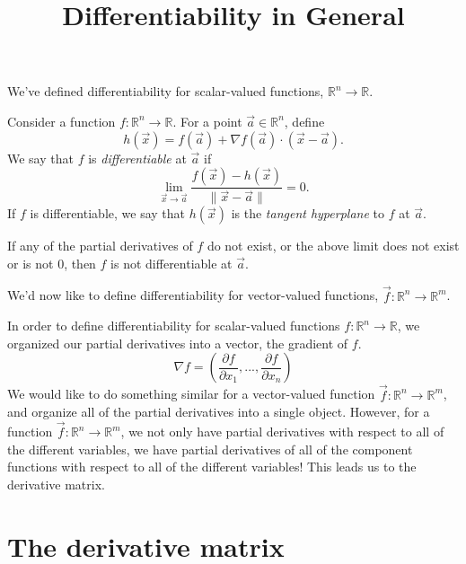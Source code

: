 \documentclass{ximera}
\title{Differentiability in General}
\begin{document}
\begin{abstract}
\end{abstract}
\maketitle

We've defined differentiability for scalar-valued functions, $\mathbb{R}^n\rightarrow\mathbb{R}$.

\begin{definition}
Consider a function $f:\mathbb{R}^n\rightarrow\mathbb{R}$. For a point $\vec{a}\in\mathbb{R}^n$, define
\[
h(\vec{x}) = f(\vec{a})+\nabla f(\vec{a})\cdot (\vec{x}-\vec{a}).
\]
We say that $f$ is \emph{differentiable} at $\vec{a}$ if
\[
\lim_{\vec{x}\rightarrow \vec{a}}\frac{f(\vec{x}) - h(\vec{x})}{\|\vec{x}-\vec{a}\|} = 0.
\]
If $f$ is differentiable, we say that $h(\vec{x})$ is the \emph{tangent hyperplane} to $f$ at $\vec{a}$.

If any of the partial derivatives of $f$ do not exist, or the above limit does not exist or is not $0$, then $f$ is not differentiable at $\vec{a}$.
\end{definition}

We'd now like to define differentiability for vector-valued functions, $\vec{f}:\mathbb{R}^n\rightarrow\mathbb{R}^m$.

In order to define differentiability for scalar-valued functions $f:\mathbb{R}^n\rightarrow\mathbb{R}$, we organized our partial derivatives into a vector, the gradient of $f$.
\[
\nabla f = \left(\frac{\partial f}{\partial x_1},...,\frac{\partial f}{\partial x_n}\right)
\]
We would like to do something similar for a vector-valued function $\vec{f}:\mathbb{R}^n\rightarrow\mathbb{R}^m$, and organize all of the partial derivatives into a single object. However, for a function $\vec{f}:\mathbb{R}^n\rightarrow\mathbb{R}^m$, we not only have partial derivatives with respect to all of the different variables, we have partial derivatives of all of the component functions with respect to all of the different variables! This leads us to the derivative matrix.

\section*{The derivative matrix}
\end{document}
